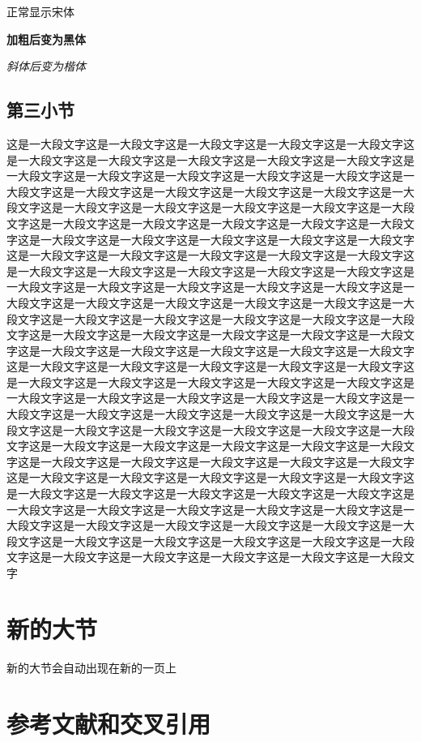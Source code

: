\documentclass[supercite,gbtcite]{HustGraduPaper}
\begin{document}
	{正常显示宋体}
	
	{\bfseries 加粗后变为黑体}
	
	{\itshape 斜体后变为楷体}
	
	\subsection{第三小节}
	这是一大段文字这是一大段文字这是一大段文字这是一大段文字这是一大段文字这是一大段文字这是一大段文字这是一大段文字这是一大段文字这是一大段文字这是一大段文字这是一大段文字这是一大段文字这是一大段文字这是一大段文字这是一大段文字这是一大段文字这是一大段文字这是一大段文字这是一大段文字这是一大段文字这是一大段文字这是一大段文字这是一大段文字这是一大段文字这是一大段文字这是一大段文字这是一大段文字这是一大段文字这是一大段文字这是一大段文字这是一大段文字这是一大段文字这是一大段文字这是一大段文字这是一大段文字这是一大段文字这是一大段文字这是一大段文字这是一大段文字这是一大段文字这是一大段文字这是一大段文字这是一大段文字这是一大段文字这是一大段文字这是一大段文字这是一大段文字这是一大段文字这是一大段文字这是一大段文字这是一大段文字这是一大段文字这是一大段文字这是一大段文字这是一大段文字这是一大段文字这是一大段文字这是一大段文字这是一大段文字这是一大段文字这是一大段文字这是一大段文字这是一大段文字这是一大段文字这是一大段文字这是一大段文字这是一大段文字这是一大段文字这是一大段文字这是一大段文字这是一大段文字这是一大段文字这是一大段文字这是一大段文字这是一大段文字这是一大段文字这是一大段文字这是一大段文字这是一大段文字这是一大段文字这是一大段文字这是一大段文字这是一大段文字这是一大段文字这是一大段文字这是一大段文字这是一大段文字这是一大段文字这是一大段文字这是一大段文字这是一大段文字这是一大段文字这是一大段文字这是一大段文字这是一大段文字这是一大段文字这是一大段文字这是一大段文字这是一大段文字这是一大段文字这是一大段文字这是一大段文字这是一大段文字这是一大段文字这是一大段文字这是一大段文字这是一大段文字这是一大段文字这是一大段文字这是一大段文字这是一大段文字这是一大段文字这是一大段文字这是一大段文字这是一大段文字这是一大段文字这是一大段文字这是一大段文字这是一大段文字这是一大段文字这是一大段文字这是一大段文字这是一大段文字这是一大段文字这是一大段文字这是一大段文字这是一大段文字这是一大段文字这是一大段文字这是一大段文字这是一大段文字这是一大段文字这是一大段文字这是一大段文字这是一大段文字这是一大段文字这是一大段文字这是一大段文字
	\section{新的大节}
	新的大节会自动出现在新的一页上
	\section{参考文献和交叉引用}\label{sec:ref}
\end{document}
